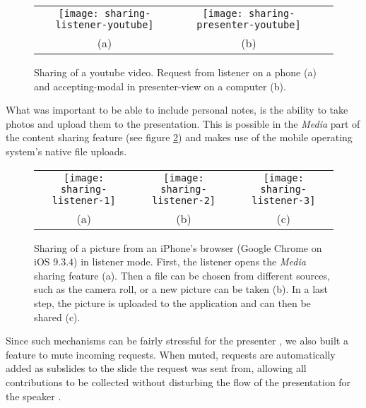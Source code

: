 \begin{figure}
\centering
\begin{tabular}{ccc}
\texttt{[image: sharing-listener-youtube]} &
\texttt{[image: sharing-presenter-youtube]} \\
(a) & (b)
\end{tabular}
\caption{Sharing of a youtube video. Request from listener on a phone (a) and accepting-modal in presenter-view on a computer (b).}
\label{fig:design-sharing-youtube}
\end{figure}

What was important to be able to include personal notes, is the ability to take photos and upload them to the presentation. This is possible in the \emph{Media} part of the content sharing feature (see figure \ref{fig:design-sharing-picture}) and makes use of the mobile operating system's native file uploads.

\begin{figure}
\centering
\begin{tabular}{ccc}
\texttt{[image: sharing-listener-1]} &
\texttt{[image: sharing-listener-2]} &
\texttt{[image: sharing-listener-3]} \\
(a) & (b) & (c)
\end{tabular}
\caption{Sharing of a picture from an iPhone's browser (Google Chrome on iOS $9.3.4$) in listener mode. First, the listener opens the \emph{Media} sharing feature (a). Then a file can be chosen from different sources, such as the camera roll, or a new picture can be taken (b). In a last step, the picture is uploaded to the application and can then be shared (c).}
\label{fig:design-sharing-picture}
\end{figure}

Since such mechanisms can be fairly stressful for the presenter \cite{Teevan:MobileFeedbackDuringPresentation, Wacker:PresenterExperience}, we also built a feature to mute incoming requests. When muted, requests are automatically added as subslides to the slide the request was sent from, allowing all contributions to be collected without disturbing the flow of the presentation for the speaker \cite{Dieberger:NarrativeFlow}.
